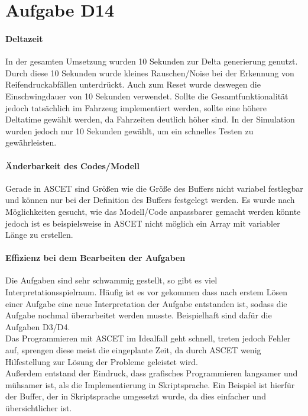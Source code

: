 \chapter{Aufgabe D14}
\subsubsection{Deltazeit}
In der gesamten Umsetzung wurden 10 Sekunden zur Delta generierung genutzt. Durch diese 10 Sekunden wurde kleines Rauschen/Noise bei der Erkennung von Reifendruckabfällen unterdrückt. Auch zum Reset wurde deswegen die Einschwingdauer von 10 Sekunden verwendet.
Sollte die Gesamtfunktionalität jedoch tatsächlich im Fahrzeug implementiert werden, sollte eine höhere Deltatime gewählt werden, da Fahrzeiten deutlich höher sind. In der Simulation wurden jedoch nur 10 Sekunden gewählt, um ein schnelles Testen zu gewährleisten.

\subsubsection{Änderbarkeit des Codes/Modell}
Gerade in ASCET sind Größen wie die Größe des Buffers nicht variabel festlegbar und können nur bei der Definition des Buffers festgelegt werden. Es wurde nach Möglichkeiten gesucht, wie das Modell/Code anpassbarer gemacht werden könnte jedoch ist es beispielsweise in ASCET nicht möglich ein Array mit variabler Länge zu erstellen. 

\subsubsection{Effizienz bei dem Bearbeiten der Aufgaben}
Die Aufgaben sind sehr schwammig gestellt, so gibt es viel Interpretationsspielraum. Häufig ist es vor gekommen dass nach erstem Lösen einer Aufgabe eine neue Interpretation der Aufgabe entstanden ist, sodass die Aufgabe nochmal überarbeitet werden musste. Beispielhaft sind dafür die Aufgaben D3/D4.\\
Das Programmieren mit ASCET im Idealfall geht schnell, treten jedoch Fehler auf, sprengen diese meist die eingeplante Zeit, da durch ASCET wenig Hilfestellung zur Lösung der Probleme geleistet wird.\\
Außerdem entstand der Eindruck, dass grafisches Programmieren langsamer und mühsamer ist, als die Implementierung in Skriptsprache. Ein Beispiel ist hierfür der Buffer, der in Skriptsprache umgesetzt wurde, da dies einfacher und übersichtlicher ist.\\